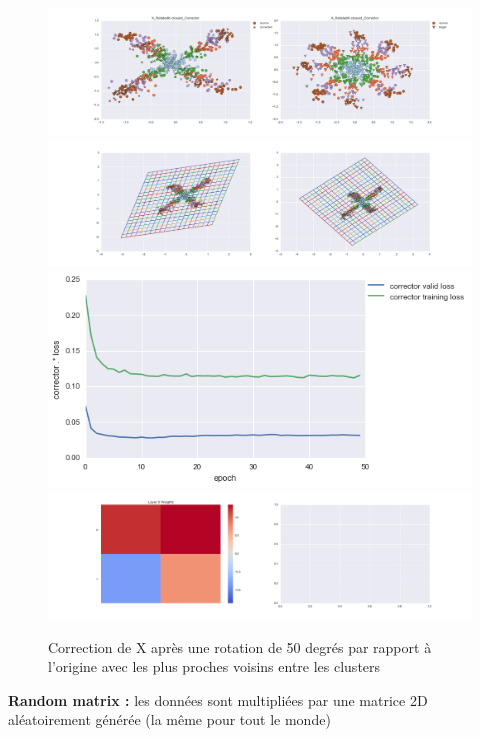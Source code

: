 \begin{figure}[H] %
\centering
\includegraphics[width=\linewidth]{fig/24-05-2016/X/X_RotatedK-closest_Corrector-DATA.png}
\includegraphics[width=\linewidth]{fig/24-05-2016/X/X_RotatedK-closest_Corrector-GridCheck.png}
\includegraphics[width=0.45\linewidth]{fig/24-05-2016/X/X_RotatedK-closest_Corrector-Learning_curve.png}
\includegraphics[width=\linewidth]{fig/24-05-2016/X/X_RotatedK-closest_Corrector-W.png}
\caption{Correction de X après une rotation de 50 degrés par rapport à l'origine avec les plus proches voisins entre les clusters}
\label{fig:recap-X-rot-exhaustive}
\end{figure}

{\Large \textbf{Random matrix :}} les données sont multipliées par une matrice 2D aléatoirement générée
 (la même pour tout le monde)

